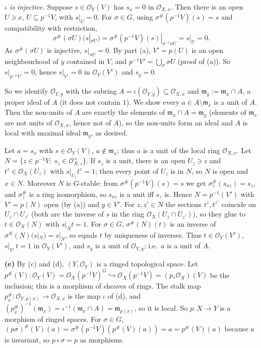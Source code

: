 \documentclass[11pt]{article}
\begin{document}
\emph{$\iota$ is injective.} Suppose $s\in\mathcal{O}_Y(V)$ has $s_x=0$ in $\mathcal{O}_{X,x}$. Then there is an open $U\ni x$, $U\subseteq p^{-1}V$, with $s|_U=0$. For $\sigma\in G$, using $\sigma^\#(p^{-1}V)(s)=s$ and compatibility with restriction,
\[ \sigma^\#(\sigma U)\bigl(s|_{\sigma U}\bigr)=\sigma^\#(p^{-1}V)(s)|_{\sigma^{-1}\sigma U}=s|_U=0 . \]
As $\sigma^\#(\sigma U)$ is injective, $s|_{\sigma U}=0$. By part (a), $V'=p(U)$ is an open neighbourhood of $y$ contained in $V$, and $p^{-1}V'=\bigcup_\sigma\sigma U$ (proof of (a)). So $s|_{p^{-1}V'}=0$, hence $s|_{V'}=0$ in $\mathcal{O}_Y(V')$ and $s_y=0$.

So we identify $\mathcal{O}_{Y,y}$ with the subring $A=\iota(\mathcal{O}_{Y,y})\subseteq\mathcal{O}_{X,x}$ and $\mathfrak{m}_y:=\mathfrak{m}_x\cap A$, a proper ideal of $A$ (it does not contain $1$). We show every $a\in A\setminus\mathfrak{m}_x$ is a unit of $A$. Then the non-units of $A$ are exactly the elements of $\mathfrak{m}_x\cap A=\mathfrak{m}_y$ (elements of $\mathfrak{m}_x$ are not units of $\mathcal{O}_{X,x}$, hence not of $A$), so the non-units form an ideal and $A$ is local with maximal ideal $\mathfrak{m}_y$, as desired.

Let $a=s_x$ with $s\in\mathcal{O}_Y(V)$, $a\notin\mathfrak{m}_x$; thus $a$ is a unit of the local ring $\mathcal{O}_{X,x}$. Let $N=\{z\in p^{-1}V:\ s_z\in\mathcal{O}_{X,z}^\times\}$. If $s_z$ is a unit, there is an open $U_z\ni z$ and $t^z\in\mathcal{O}_X(U_z)$ with $s|_{U_z}t^z=1$; then every point of $U_z$ is in $N$, so $N$ is open and $x\in N$. Moreover $N$ is $G$-stable: from $\sigma^\#(p^{-1}V)(s)=s$ we get $\sigma^\#_z(s_{\sigma z})=s_z$, and $\sigma_z^\#$ is a ring isomorphism, so $s_{\sigma z}$ is a unit iff $s_z$ is. Hence $N=p^{-1}(V')$ with $V'=p(N)$ open (by (a)) and $y\in V'$. For $z,z'\in N$ the sections $t^z,t^{z'}$ coincide on $U_z\cap U_{z'}$ (both are the inverse of $s$ in the ring $\mathcal{O}_X(U_z\cap U_{z'})$), so they glue to $t\in\mathcal{O}_X(N)$ with $s|_Nt=1$. For $\sigma\in G$, $\sigma^\#(N)(t)$ is an inverse of $\sigma^\#(N)(s|_N)=s|_N$, so equals $t$ by uniqueness of inverses. Thus $t\in\mathcal{O}_Y(V')$, $s|_{V'}\,t=1$ in $\mathcal{O}_Y(V')$, and $s_y$ is a unit of $\mathcal{O}_{Y,y}$; i.e.\ $a$ is a unit of $A$.

\textbf{(e)} By (c) and (d), $(Y,\mathcal{O}_Y)$ is a ringed topological space. Let $p^\#(V):\mathcal{O}_Y(V)=\mathcal{O}_X(p^{-1}V)^G\hookrightarrow\mathcal{O}_X(p^{-1}V)=(p_*\mathcal{O}_X)(V)$ be the inclusion; this is a morphism of sheaves of rings. The stalk map $p^\#_x:\mathcal{O}_{Y,p(x)}\to\mathcal{O}_{X,x}$ is the map $\iota$ of (d), and $(p_x^\#)^{-1}(\mathfrak{m}_x)=\iota^{-1}(\mathfrak{m}_x\cap A)=\mathfrak{m}_{p(x)}$, so it is local. So $p:X\to Y$ is a morphism of ringed spaces. For $\sigma\in G$, $(p\sigma)^\#(V)(a)=\sigma^\#(p^{-1}V)(p^\#(V)(a))=a=p^\#(V)(a)$ because $a$ is invariant, so $p\circ\sigma=p$ as morphisms.
\end{document}
